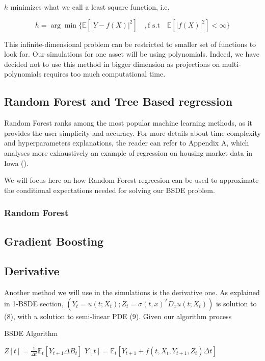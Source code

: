 \documentclass[english,11pt,openany]{article}
\theoremstyle{definition}
\theoremstyle{plain}
\theoremstyle{definition}
\begin{document}
	$h$ minimizes what we call a least square function, i.e. 
	
	\begin{equation}
	h = \arg \min\{\mathbb{E}[|Y - f(X)|^2] \quad,  \text{f s.t} \quad \mathbb{E}[|f(X)|^2]<\infty\}
	\end{equation}
	
	This infinite-dimensional problem can be restricted to smaller set of functions to look for. 
	Our simulations for one asset will be using polynomials. 
	Indeed, we have decided not to use this method in bigger dimension as projections on multi-polynomials requires too much computational time. 
	
	
	\subsection{Random Forest and Tree Based regression}
	
	Random Forest ranks among the most popular machine learning methods, as it provides the user simplicity and accuracy. 
	For more details about time complexity and hyperparameters explanations, the reader can refer to Appendix A, which analyses more exhaustively an example of regression on housing market data in Iowa (\cite{kaggle:housing}). 
	
	We will focus here on how Random Forest regreesion can be used to approximate the conditional expectations needed for solving our BSDE problem. 
	
	
	\subsubsection{Random Forest}
	
	
	
	
	\subsection{Gradient Boosting}
	
	
	\subsection{Derivative}
	
	Another method we will use in the simulations is the derivative one. 
	As explained in 1-BSDE section, $(Y_t = u(t;X_t);Z_t =\sigma(t,x)^T D_xu(t;X_t))$ is solution to (8), with $u$ solution to semi-linear PDE (9).  
	Given our algorithm process
	
	\begin{algorithm}
		\caption{BSDE Algorithm}
		\label{algo:derivative1}
		\begin{algorithmic}[1]
			\State $Z[t] =\frac{1}{\Delta t}\mathbb{E}_t[Y_{t + 1} \Delta B_t]$
			\State $Y[t] = \mathbb{E}_t[Y_{t+1} +  f(t,X_t, Y_{t+1}, Z_t)\Delta t]$
			\EndFor
			\EndProcedure
		\end{algorithmic}
	\end{algorithm}
	
\end{document}
